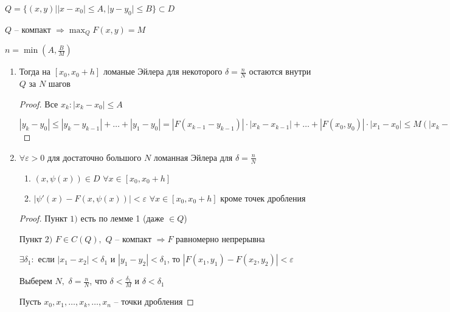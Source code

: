\begin{properties}\thmslashn

	$Q = \{(x, y) | |x - x_0| \leqslant A, |y - y_0| \leqslant B\} \subset D$

	$Q$ -- компакт $\Rightarrow \max_{Q} F(x, y) = M$ 

	$n = \min\left(A, \frac{B}{M}\right)$
	\begin{enumerate}
		\item
		Тогда на $[x_0, x_0 + h]$ ломаные Эйлера для некоторого $\delta = \frac{n}{N}$ остаются внутри $Q$ за $N$ шагов
		
		\begin{proof}\thmslashn
			
			Все $x_k: |x_k - x_0| \leqslant A$
			
			$|y_k - y_0| \leqslant |y_k - y_{k-1}| + \ldots + |y_1 - y_0| = |F(x_{k-1} - y_{k-1})| \cdot |x_k - x_{k-1}| + \ldots + |F(x_0, y_0)|\cdot|x_{1} - x_0| \leqslant M(|x_{k} - x_{k-1}| + \ldots + |x_1 - x_0|) = M\cdot \delta \cdot k \leqslant M \cdot \delta \cdot N \leqslant M\cdot n \leqslant B$
			
		\end{proof}
		
		\item
		$\forall \varepsilon > 0$ для достаточно большого $N$ ломанная Эйлера для $\delta = \frac{n}{N}$
		
		\begin{enumerate}
			\item
			$(x, \psi(x)) \in D\,\,\forall x \in [x_0, x_0 + h]$
			
			\item
			$|\psi'(x) - F(x, \psi(x))| < \varepsilon \,\,\forall x \in [x_0, x_0 + h]$ кроме точек дробления

		\end{enumerate}

		\begin{proof}\thmslashn

			Пункт $1)$ есть по лемме 1 (даже $\in Q$)

			Пункт $2)$ $F \in C(Q), \,\, Q$ -- компакт $\Rightarrow F$ равномерно непрерывна

			$\exists \delta_1:$ если $|x_1 - x_2| < \delta_1$ и $|y_1 - y_2| < \delta_1$, то $|F(x_1, y_1) - F(x_2, y_2)| < \varepsilon$

			Выберем $N, \,\,\delta = \frac{n}{N}$, что $\delta < \frac{\delta_1}{M}$ и $\delta < \delta_1$

			Пусть $x_0, x_1, \ldots, x_k, \ldots, x_n$ -- точки дробления


\end{proof}
\end{enumerate}
\end{properties}
